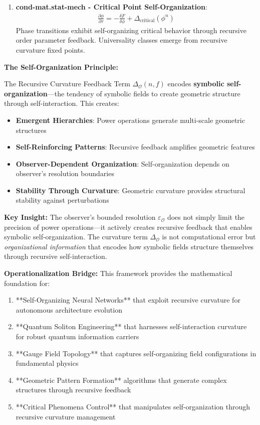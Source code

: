 \begin{scholium}
\begin{enumerate}
\item \textbf{cond-mat.stat-mech - Critical Point Self-Organization}:
   \begin{align}
   \frac{\partial \phi}{\partial \tau} = -\frac{\delta F}{\delta \phi} + \Delta_{\text{critical}}(\phi^n)
   \end{align}
   Phase transitions exhibit self-organizing critical behavior through recursive order parameter feedback. Universality classes emerge from recursive curvature fixed points.
\end{enumerate}
\end{scholium}

\textbf{The Self-Organization Principle:}

The Recursive Curvature Feedback Term $\Delta_{\mathcal{O}}(n, f)$ encodes \textbf{symbolic self-organization}—the tendency of symbolic fields to create geometric structure through self-interaction. This creates:

\begin{itemize}
\item \textbf{Emergent Hierarchies}: Power operations generate multi-scale geometric structures
\item \textbf{Self-Reinforcing Patterns}: Recursive feedback amplifies geometric features
\item \textbf{Observer-Dependent Organization}: Self-organization depends on observer's resolution boundaries
\item \textbf{Stability Through Curvature}: Geometric curvature provides structural stability against perturbations
\end{itemize}

\textbf{Key Insight:} The observer's bounded resolution $\varepsilon_{\mathcal{O}}$ does not simply limit the precision of power operations—it actively creates recursive feedback that enables symbolic self-organization. The curvature term $\Delta_{\mathcal{O}}$ is not computational error but \textit{organizational information} that encodes how symbolic fields structure themselves through recursive self-interaction.

\textbf{Operationalization Bridge:}
This framework provides the mathematical foundation for:
\begin{enumerate}
\item **Self-Organizing Neural Networks** that exploit recursive curvature for autonomous architecture evolution
\item **Quantum Soliton Engineering** that harnesses self-interaction curvature for robust quantum information carriers
\item **Gauge Field Topology** that captures self-organizing field configurations in fundamental physics
\item **Geometric Pattern Formation** algorithms that generate complex structures through recursive feedback
\item **Critical Phenomena Control** that manipulates self-organization through recursive curvature management
\end{enumerate}

